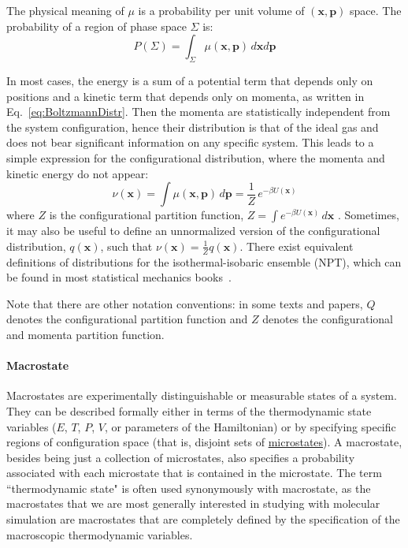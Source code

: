 \documentclass[9pt,review]{livecoms}
\newcommand{\vx}{\mathbf{x}}
\newcommand{\vp}{\mathbf{p}}
\begin{document}
The physical meaning of $\mu$ is a probability per unit volume of $(\vx, \vp)$ space. The probability of a region of phase space $\Sigma$ is:
\begin{equation}
    P(\Sigma) = \int_\Sigma \mu(\vx, \vp) \, d\vx d\vp
\end{equation}

In most cases, the energy is a sum of a potential term that depends only on positions and a kinetic term that depends only on momenta, as written in Eq.~\ref{eq:BoltzmannDistr}.
Then the momenta are statistically independent from the system configuration, hence their distribution is that of the ideal gas and does not bear significant information on any specific system.
This leads to a simple expression for the configurational distribution, where the momenta and kinetic energy do not appear:
\begin{equation}
\nu(\vx) = \int \mu(\vx, \vp) \, d\vp = \frac{1}{Z} \, e^{-\beta U(\vx)}
\end{equation}
where $Z$ is the configurational partition function, $ Z = \int e^{-\beta U(\vx)} \, d\vx$ . Sometimes, it may also be useful to define an unnormalized version of the configurational distribution, $q(\vx)$, such that $\nu(\vx) = \frac{1}{Z}q(\vx)$. There exist equivalent definitions of distributions for the isothermal-isobaric ensemble (NPT), which can be found in most statistical mechanics books~\cite{Zuckerman2010, Tuckerman2010}.

Note that there are other notation conventions: in some texts and papers, $Q$ denotes the configurational partition function and $Z$ denotes the configurational and momenta partition function.


\hypertarget{ref:Macrostate} {\paragraph{Macrostate}}

Macrostates are experimentally distinguishable or measurable states of a system.
They can be described formally either in terms of the thermodynamic state variables ($E$, $T$, $P$, $V$, or parameters of the Hamiltonian) or by specifying specific regions of configuration space (that is, disjoint sets of \hyperlink{ref:Microstate} {microstates}). A macrostate, besides being just a collection of microstates, also specifies a probability associated with each microstate that is contained in the microstate. The term ``thermodynamic state" is often used synonymously with macrostate, as the macrostates that we are most generally interested in studying with molecular simulation are macrostates that are completely defined by the specification of the macroscopic thermodynamic variables.
\end{document}
